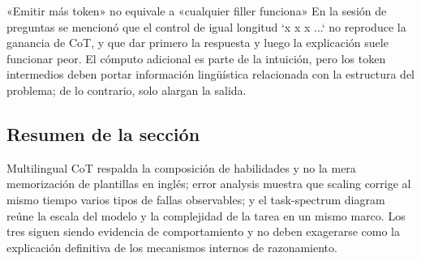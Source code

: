 \begin{warningbox}{«Emitir más token» no equivale a «cualquier filler funciona»}
En la sesión de preguntas se mencionó que el control de igual longitud `x x x ...` no reproduce la ganancia de CoT, y que dar primero la respuesta y luego la explicación suele funcionar peor. El cómputo adicional es parte de la intuición, pero los token intermedios deben portar información lingüística relacionada con la estructura del problema; de lo contrario, solo alargan la salida.
\end{warningbox}

\subsection{Resumen de la sección}

Multilingual CoT respalda la composición de habilidades y no la mera memorización de plantillas en inglés; error analysis muestra que scaling corrige al mismo tiempo varios tipos de fallas observables; y el task-spectrum diagram reúne la escala del modelo y la complejidad de la tarea en un mismo marco. Los tres siguen siendo evidencia de comportamiento y no deben exagerarse como la explicación definitiva de los mecanismos internos de razonamiento.
